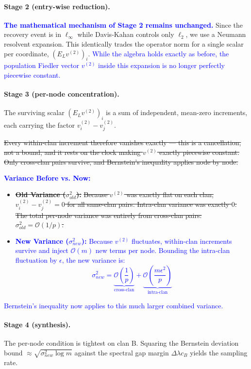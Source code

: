 \documentclass{article}
\begin{document}
\paragraph{Stage 2 (entry-wise reduction).} 
\textcolor{blue}{\textbf{The mathematical mechanism of Stage 2 remains unchanged.}} Since the recovery event is in $\ell_\infty$ while Davis-Kahan controls only $\ell_2$, we use a Neumann resolvent expansion. This identically trades the operator norm for a single scalar per coordinate, $(E_L v^{(2)})_i$. \textcolor{blue}{While the algebra holds exactly as before, the population Fiedler vector $v^{(2)}$ inside this expansion is no longer perfectly piecewise constant.}

\paragraph{Stage 3 (per-node concentration).} 
The surviving scalar $(E_L v^{(2)})_i$ is a sum of independent, mean-zero increments, each carrying the factor $v_i^{(2)} - v_j^{(2)}$. 

\sout{Every within-clan increment therefore vanishes exactly --- this is a cancellation, not a bound, and it rests on the clock making $v^{(2)}$ exactly piecewise constant. Only cross-clan pairs survive, and Bernstein's inequality applies node by node.}

\textcolor{blue}{\textbf{Variance Before vs. Now:}}
\begin{itemize}
    \item \sout{\textbf{Old Variance ($\sigma^2_{old}$):}} \sout{Because $v^{(2)}$ was exactly flat on each clan, $v_i^{(2)} - v_j^{(2)} = 0$ for all same-clan pairs. Intra-clan variance was exactly $0$. The total per-node variance was entirely from cross-clan pairs: $\sigma^2_{old} = \mathcal{O}(1/p)$.}
    \item \textcolor{blue}{\textbf{New Variance ($\sigma^2_{new}$):}} \textcolor{blue}{Because $v^{(2)}$ fluctuates, within-clan increments survive and inject $\mathcal{O}(m)$ new terms per node. Bounding the intra-clan fluctuation by $\epsilon$, the new variance is:}
    \textcolor{blue}{$$ \sigma^2_{new} = \underbrace{\mathcal{O}\left(\frac{1}{p}\right)}_{\text{cross-clan}} + \underbrace{\mathcal{O}\left(\frac{m \epsilon^2}{p}\right)}_{\text{intra-clan}} $$}
\end{itemize}
\textcolor{blue}{Bernstein's inequality now applies to this much larger combined variance.}

\paragraph{Stage 4 (synthesis).} 
The per-node condition is tightest on clan B. Squaring the Bernstein deviation bound $\approx \sqrt{\sigma_{new}^2 \log m}$ against the spectral gap margin $\Delta\lambda c_B$ yields the sampling rate. 
\end{document}
